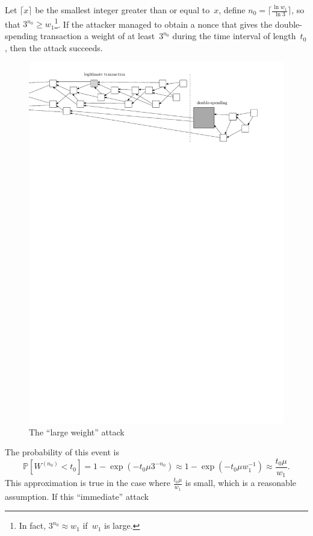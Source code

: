 \documentclass[12pt]{article}
\newcommand{\IP}{\mathbb{P}}
\begin{document}
\begin{CJK}{UTF8}{bkai}
Let $\lceil x\rceil$ be the smallest integer greater than
or equal to~$x$,
define $n_0=\big\lceil \frac{\ln w_1}{\ln 3}\big\rceil$, 
so that $3^{n_0}\geq w_1$\footnote{In fact, $3^{n_0}\approx w_1$
if~$w_1$ is large.}. If the attacker managed to obtain a nonce
that gives the double-spending transaction a weight of at least~$3^{n_0}$ during the time interval
of length~$t_0$,
 then the attack 
succeeds. 
\begin{figure}
 \centering \includegraphics[width=\textwidth]{bigPoW} 
\caption{The ``large weight'' attack}
\label{f_bigPoW}
\end{figure}
The probability of this event is
\[
 \IP[W^{(n_0)}<t_0]=1-\exp(-t_0\mu 3^{-n_0})
  \approx 1-\exp(-t_0\mu w_1^{-1})
  \approx \frac{t_0\mu}{w_1}.
\]
This approximation is true in the case where 
$\frac{t_0\mu}{w_1}$ is small, which is 
a reasonable assumption. If this ``immediate'' attack

\end{CJK}
\end{document}
